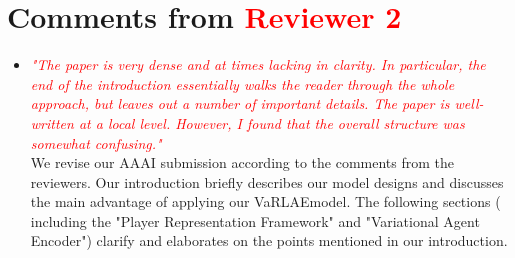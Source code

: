 \documentclass[letterpaper]{article} %
\newcommand{\system}{VaRLAE\;}
\begin{document}
\section{Comments from \textcolor{red}{Reviewer 2}}
\begin{itemize}
    \item \textcolor{Red}{\it "The paper is very dense and at times lacking in clarity. In particular, the end of the introduction essentially walks the reader through the whole approach, but leaves out a number of important details. The paper is well-written at a local level. However, I found that the overall structure was somewhat confusing."}\\
    We revise our AAAI submission according to the comments from the reviewers. Our introduction briefly describes our model designs and discusses the main advantage of applying our \system model. The following sections ( including the "Player Representation Framework" and "Variational Agent Encoder") clarify and elaborates on the points mentioned in our introduction.
\end{itemize}
\end{document}
